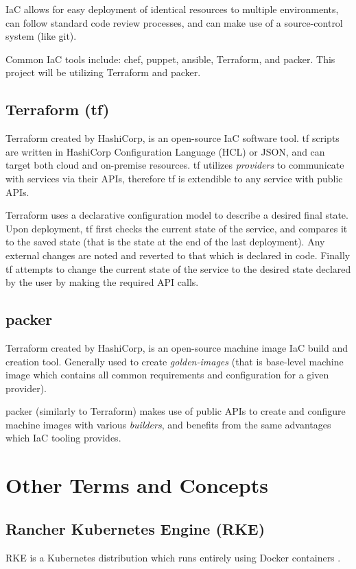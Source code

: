 IaC allows for easy deployment of identical resources to multiple environments, 
can follow standard code review processes, and can make use of a source-control system (like git).

Common IaC tools include: chef\cite{chef}, puppet\cite{puppet}, ansible\cite{ansible}, Terraform\cite{terraform}, and packer\cite{packer}. 
This project will be utilizing Terraform and packer.
 
\subsection{Terraform (tf)}
Terraform created by HashiCorp\cite{hashicorp}, is an open-source IaC software tool. 
tf scripts are written in HashiCorp Configuration Language (HCL) or JSON, and can target both cloud and on-premise resources.
tf utilizes \textit{providers} to communicate with services via their APIs, therefore tf is extendible to any service with public APIs. 

Terraform uses a declarative configuration model to describe a desired final state. Upon deployment, tf first checks the current state of the service,
and compares it to the saved state (that is the state at the end of the last deployment). Any external changes are noted and reverted to that which is declared in code.
Finally tf attempts to change the current state of the service to the desired state declared by the user by making the required API calls.

\subsection{packer}
Terraform created by HashiCorp\cite{hashicorp}, is an open-source machine image IaC build and creation tool. 
Generally used to create \emph{golden-images} \cite{HashiCorp_packer_docs} (that is base-level machine image which contains all common requirements and configuration for a given provider).

packer (similarly to Terraform) makes use of public APIs to create and configure machine images with various \textit{builders}, and benefits from the same advantages which IaC tooling provides.


\section{Other Terms and Concepts}
\subsection*{Rancher Kubernetes Engine (RKE)}
RKE is a Kubernetes distribution which runs entirely using Docker containers \cite{rke}. 

